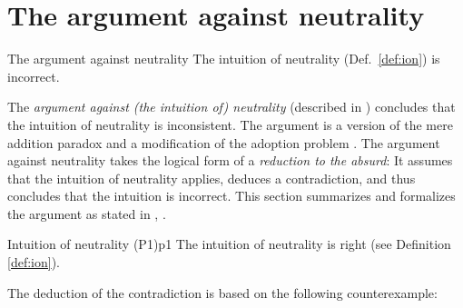 \section{The argument against neutrality}
\label{sec:arg}

\begin{Theorem}{The argument against neutrality}{}
The intuition of neutrality (Def.~\ref{def:ion}) is incorrect.
\end{Theorem}

The \emph{argument against (the intuition of) neutrality} (described in ) concludes that the intuition of neutrality is inconsistent. The argument is a version of the mere addition paradox \cite[p.~148]{broome_2004} and a modification of the adoption problem \cite[p.~161]{broome_2004}. The argument against neutrality takes the logical form of a \emph{reduction to the absurd}: It assumes that the intuition of neutrality applies, deduces a contradiction, and thus concludes that the intuition is incorrect. This section summarizes and formalizes the argument as stated in , . 

\begin{Premise}{Intuition of neutrality (P1)}{p1}
The intuition of neutrality is right (see Definition \ref{def:ion}).
\end{Premise}

The deduction of the contradiction is based on the following counterexample:  

